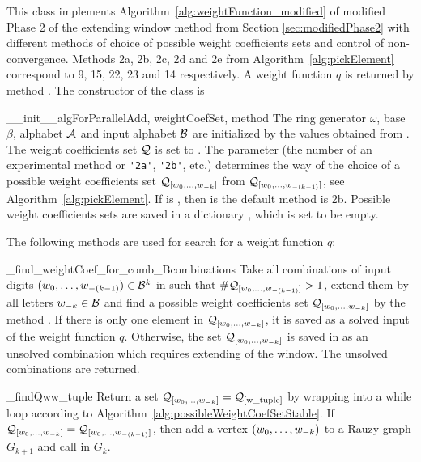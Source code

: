 
This class implements Algorithm~\ref{alg:weightFunction_modified} of modified Phase 2 of the extending window method from Section \ref{sec:modifiedPhase2} with different methods of choice of possible weight coefficients sets and control of non-convergence. Methods 2a, 2b, 2c, 2d and 2e from Algorithm~\ref{alg:pickElement} correspond to 9, 15, 22, 23 and 14 respectively. A weight function $q$ is returned by method . The constructor of the class is

\begin{method}{\_\_init\_\_}{algForParallelAdd, weightCoefSet, method}
The ring generator $\omega$, base $\beta$, alphabet $\mathcal{A}$ and input alphabet $\mathcal{B}$ are initialized by the values obtained from . The weight coefficients set $\mathcal{Q}$ is set to . The parameter  (the number of an experimental method or \verb+'2a'+, \verb+'2b'+, etc.) determines the way of the choice of a possible weight coefficients set $\mathcal{Q}_{[w_{0}, \dots, w_{-k}]}$ from $\mathcal{Q}_{[w_{0}, \dots, w_{-(k-1)}]}$, see Algorithm~\ref{alg:pickElement}. If  is , then is the default method is 2b. Possible weight coefficients sets  are saved in a dictionary , which is set to be empty.
\end{method}

The following methods are used for search for a weight function $q$:

\begin{method}{\_find\_weightCoef\_for\_comb\_B}{combinations}
Take all combinations of input digits $(w_{0}, \dots, w_{-(k-1)}) \in \mathcal{B}^{k}$ in  such that $\#\mathcal{Q}_{[w_{0}, \dots, w_{-(k-1)}]}>1$, extend them by all letters $w_{-k}\in\mathcal{B}$ and find a possible weight coefficients set $\mathcal{Q}_{[w_{0}, \dots, w_{-k}]}$ by the method . If there is only one element in $\mathcal{Q}_{[w_{0}, \dots, w_{-k}]}$, it is saved as a solved input of the weight function $q$. Otherwise, the set $\mathcal{Q}_{[w_{0}, \dots, w_{-k}]}$ is saved in  as an unsolved combination which requires extending of the window. The unsolved combinations are returned.  
\end{method}

\begin{method}{\_findQw}{w\_tuple}
Return a set $\mathcal{Q}_{[w_{0}, \dots, w_{-k}]}=\mathcal{Q}_{[\text{w\_tuple}]}$ by wrapping  into a while loop according to Algorithm~\ref{alg:possibleWeightCoefSetStable}. If $\mathcal{Q}_{[w_{0}, \dots, w_{-k}]}=\mathcal{Q}_{[w_{0}, \dots, w_{-(k-1)}]}$, then add a vertex $(w_{0}, \dots, w_{-k})$ to a Rauzy graph $G_{k+1}$ and call  in $G_{k}$.
\end{method}

